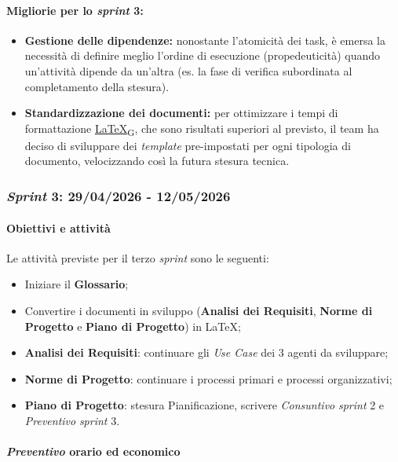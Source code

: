 \documentclass[12pt, a4paper]{article}
\newcommand{\urlglossario}{https://skynetunigroup.github.io/Code_Guardian/Documentazione/PB/glossario_v2.0.0.pdf} %
\newcommand{\glo}[2]{\href{\urlglossario\#nameddest=#2}{#1\textsubscript{G}}}
\begin{document}
{\paragraph{Migliorie per lo \textit{sprint} 3:}
\begin{itemize}
    \item \textbf{Gestione delle dipendenze:} nonostante l'atomicità dei task, è emersa la necessità di definire meglio l'ordine di esecuzione (propedeuticità) quando un'attività dipende da un'altra (es. la fase di verifica subordinata al completamento della stesura).
    \item \textbf{Standardizzazione dei documenti:} per ottimizzare i tempi di formattazione {\glo{\LaTeX{}}{latex}}, che sono risultati superiori al previsto, il team ha deciso di sviluppare dei \textit{template} pre-impostati per ogni tipologia di documento, velocizzando così la futura stesura tecnica.
\end{itemize}

\subsubsection{\textit{Sprint} 3: 29/04/2026 - 12/05/2026}

\paragraph{Obiettivi e attività}

Le attività previste per il terzo \textit{sprint} sono le seguenti:

\begin{itemize}
\item
    Iniziare il \textbf{Glossario};
\item
  Convertire i documenti in sviluppo (\textbf{Analisi dei Requisiti}, \textbf{Norme di Progetto} e \textbf{Piano di Progetto}) in \LaTeX{};
\item
  \textbf{Analisi dei Requisiti}: continuare gli \textit{Use Case} dei 3
  agenti da sviluppare;
\item
  \textbf{Norme di Progetto}: continuare i processi primari e processi
  organizzativi;
\item
  \textbf{Piano di Progetto}: stesura Pianificazione, scrivere \textit{Consuntivo} \textit{sprint} 2 e \textit{Preventivo} \textit{sprint} 3.
\end{itemize}


\paragraph{\textit{Preventivo} orario ed economico}

}
\end{document}
